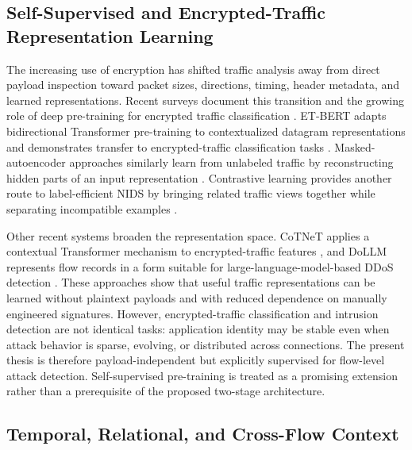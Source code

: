 \subsection{Self-Supervised and Encrypted-Traffic Representation Learning}
\label{subsec:rw_ssl_encrypted}

The increasing use of encryption has shifted traffic analysis away from direct
payload inspection toward packet sizes, directions, timing, header metadata,
and learned representations. Recent surveys document this transition and the
growing role of deep pre-training for encrypted traffic classification
\cite{Sharma2025EncryptedSurvey,Dong2025EncryptedPretrain}. ET-BERT adapts
bidirectional Transformer pre-training to contextualized datagram
representations and demonstrates transfer to encrypted-traffic classification
tasks \cite{Lin2022ETBERT}. Masked-autoencoder approaches similarly learn from
unlabeled traffic by reconstructing hidden parts of an input representation
\cite{Zhao2024MAETraffic,2024MAETraffic}. Contrastive learning provides another
route to label-efficient NIDS by bringing related traffic views together while
separating incompatible examples \cite{Li2024Contrastive}.

Other recent systems broaden the representation space. CoTNeT applies a
contextual Transformer mechanism to encrypted-traffic features
\cite{Huang2024CoTNet}, and DoLLM represents flow records in a form suitable for
large-language-model-based DDoS detection \cite{Li2024DoLLM}. These approaches
show that useful traffic representations can be learned without plaintext
payloads and with reduced dependence on manually engineered signatures.
However, encrypted-traffic classification and intrusion detection are not
identical tasks: application identity may be stable even when attack behavior
is sparse, evolving, or distributed across connections. The present thesis is
therefore payload-independent but explicitly supervised for flow-level attack
detection. Self-supervised pre-training is treated as a promising extension
rather than a prerequisite of the proposed two-stage architecture.

\subsection{Temporal, Relational, and Cross-Flow Context}
\label{subsec:rw_cross_flow}

